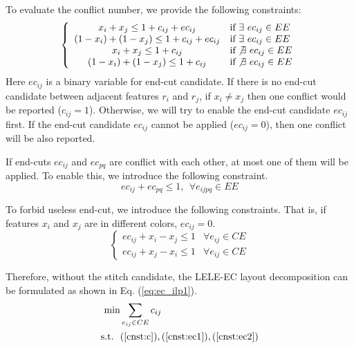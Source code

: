 \documentclass[12pt]{spieman}
\theoremstyle{plain}
\begin{document}
\begin{spacing}{1}
To evaluate the conflict number, we provide the following constraints:
\begin{equation}
  \label{cnst:c}
	\left\{
	\begin{array}{cl}
		x_i + x_j \le 1 + c_{ij} + ec_{ij}            & \textrm{if}\ \exists     \ ec_{ij} \in EE \\
    (1-x_i) + (1-x_j) \le 1 + c_{ij} + ec_{ij}    & \textrm{if}\ \exists     \ ec_{ij} \in EE \\
		x_i + x_j \le 1 + c_{ij}                      & \textrm{if}  \not\exists \ ec_{ij} \in EE \\
    (1-x_i) + (1-x_j) \le 1 + c_{ij}              & \textrm{if}  \not\exists \ ec_{ij} \in EE 
	\end{array}
	\right.
\end{equation}
Here $ec_{ij}$ is a binary variable for end-cut candidate.
If there is no end-cut candidate between adjacent features $r_i$ and $r_j$, if $x_i \ne x_j$ then one conflict would be reported ($c_{ij} = 1$).
Otherwise, we will try to enable the end-cut candidate $ec_{ij}$ first.
If the end-cut candidate $ec_{ij}$ cannot be applied ($ec_{ij} = 0$), then one conflict will be also reported.

If end-cuts $ec_{ij}$ and $ec_{pq}$ are conflict with each other, at most one of them will be applied.
To enable this, we introduce the following constraint.
\begin{equation}
  ec_{ij} + ec_{pq} \le 1,   \ \ \forall e_{ijpq} \in EE  \label{cnst:ec1} 
\end{equation}

To forbid useless end-cut, we introduce the following constraints.
That is, if features $x_{i}$ and $x_{j}$ are in different colors, $ec_{ij} = 0$.
\begin{equation}
  \label{cnst:ec2}
  \left\{
  \begin{array}{cc}
  ec_{ij} + x_i - x_j \le 1                     & \forall e_{ij} \in CE    \\
  ec_{ij} + x_j - x_i \le 1                     & \forall e_{ij} \in CE    
  \end{array}
  \right.
\end{equation}

Therefore, without the stitch candidate, the LELE-EC layout decomposition can be formulated as shown in Eq. (\ref{eq:ec_ilp1}).
\begin{align}
  \textrm{min}      &  \sum_{e_{ij} \in CE} c_{ij}                                    \label{eq:ec_ilp1}\\
  \textrm{s.t.} \ \ & (\ref{cnst:c}), (\ref{cnst:ec1}), (\ref{cnst:ec2})              \notag
\end{align}




\end{spacing}
\end{document}
